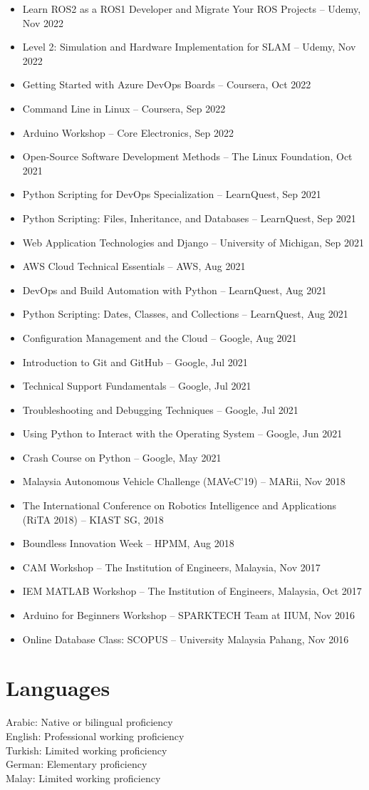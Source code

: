 \documentclass[11pt,a4paper]{article}
\begin{document}
\begin{itemize}
    \item Learn ROS2 as a ROS1 Developer and Migrate Your ROS Projects -- Udemy, Nov 2022
    \item Level 2: Simulation and Hardware Implementation for SLAM -- Udemy, Nov 2022
    \item Getting Started with Azure DevOps Boards -- Coursera, Oct 2022
    \item Command Line in Linux -- Coursera, Sep 2022
    \item Arduino Workshop -- Core Electronics, Sep 2022
    \item Open-Source Software Development Methods -- The Linux Foundation, Oct 2021
    \item Python Scripting for DevOps Specialization -- LearnQuest, Sep 2021
    \item Python Scripting: Files, Inheritance, and Databases -- LearnQuest, Sep 2021
    \item Web Application Technologies and Django -- University of Michigan, Sep 2021
    \item AWS Cloud Technical Essentials -- AWS, Aug 2021
    \item DevOps and Build Automation with Python -- LearnQuest, Aug 2021
    \item Python Scripting: Dates, Classes, and Collections -- LearnQuest, Aug 2021
    \item Configuration Management and the Cloud -- Google, Aug 2021
    \item Introduction to Git and GitHub -- Google, Jul 2021
    \item Technical Support Fundamentals -- Google, Jul 2021
    \item Troubleshooting and Debugging Techniques -- Google, Jul 2021
    \item Using Python to Interact with the Operating System -- Google, Jun 2021
    \item Crash Course on Python -- Google, May 2021
    \item Malaysia Autonomous Vehicle Challenge (MAVeC'19) -- MARii, Nov 2018
    \item The International Conference on Robotics Intelligence and Applications (RiTA 2018) -- KIAST SG, 2018
    \item Boundless Innovation Week -- HPMM, Aug 2018
    \item CAM Workshop -- The Institution of Engineers, Malaysia, Nov 2017
    \item IEM MATLAB Workshop -- The Institution of Engineers, Malaysia, Oct 2017
    \item Arduino for Beginners Workshop -- SPARKTECH Team at IIUM, Nov 2016
    \item Online Database Class: SCOPUS -- University Malaysia Pahang, Nov 2016
\end{itemize}

\section*{Languages}

Arabic: Native or bilingual proficiency\\
English: Professional working proficiency\\
Turkish: Limited working proficiency\\
German: Elementary proficiency\\
Malay: Limited working proficiency
\end{document}
